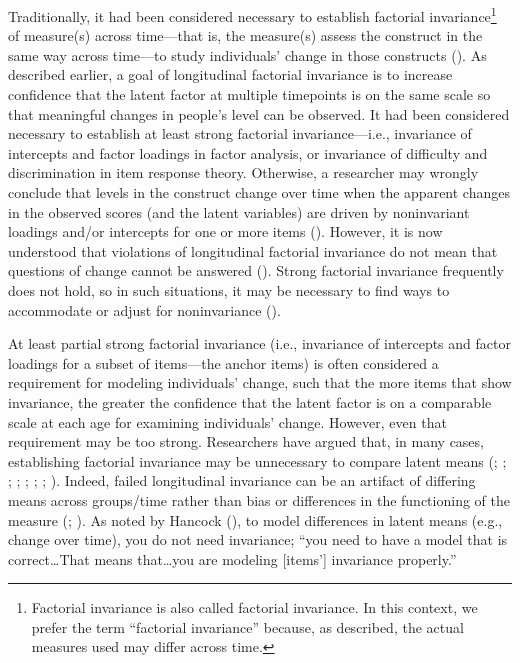 \documentclass[
  american,
  letterpaper,
  12pt]{article}
\begin{document}
Traditionally, it had been considered necessary to establish factorial
invariance\footnote{Factorial invariance is also called factorial
  invariance. In this context, we prefer the term ``factorial
  invariance'' because, as described, the actual measures used may
  differ across time.} of measure(s) across time---that is, the
measure(s) assess the construct in the same way across time---to study
individuals' change in those constructs
(). As described
earlier, a goal of longitudinal factorial invariance is to increase
confidence that the latent factor at multiple timepoints is on the same
scale so that meaningful changes in people's level can be observed. It
had been considered necessary to establish at least strong factorial
invariance---i.e., invariance of intercepts and factor loadings in
factor analysis, or invariance of difficulty and discrimination in item
response theory. Otherwise, a researcher may wrongly conclude that
levels in the construct change over time when the apparent changes in
the observed scores (and the latent variables) are driven by
noninvariant loadings and/or intercepts for one or more items
(). However, it is now understood that
violations of longitudinal factorial invariance do not mean that
questions of change cannot be answered (). Strong factorial invariance frequently does not hold, so in such
situations, it may be necessary to find ways to accommodate or adjust
for noninvariance ().

At least partial strong factorial invariance (i.e., invariance of
intercepts and factor loadings for a subset of items---the anchor items)
is often considered a requirement for modeling individuals' change, such
that the more items that show invariance, the greater the confidence
that the latent factor is on a comparable scale at each age for
examining individuals' change. However, even that requirement may be too
strong. Researchers have argued that, in many cases, establishing
factorial invariance may be unnecessary to compare latent means
(;
;
;
;
;
;
;
). Indeed, failed
longitudinal invariance can be an artifact of differing means across
groups/time rather than bias or differences in the functioning of the
measure (;
). As noted by
Hancock (), to model differences in
latent means (e.g., change over time), you do not need invariance; ``you
need to have a model that is correct\ldots That means that\ldots you are
modeling {[}items'{]} invariance properly.''
\end{document}
